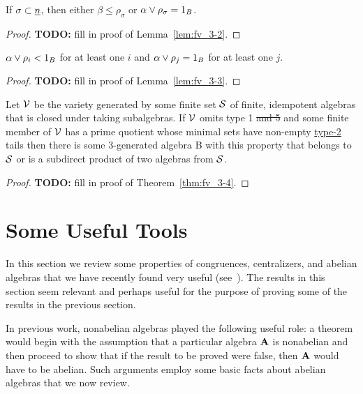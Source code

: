 \begin{lem}
  \label{lem:fv_3-2}
  If $\sigma \subset \underline{n}$, then
  either $\beta \leq \rho_\sigma$ or $\alpha \vee \rho_\sigma = 1_B$.
\end{lem}
\begin{proof}
  {\bf TODO:} fill in proof of  Lemma~\ref{lem:fv_3-2}.
\end{proof}

\begin{lem}
  \label{lem:fv_3-3}
  $\alpha \vee \rho_i < 1_B$ for at least one $i$ and $\alpha \vee \rho_j = 1_B$
  for at least one $j$.  
\end{lem}
\begin{proof}
  {\bf TODO:} fill in proof of  Lemma~\ref{lem:fv_3-3}.
\end{proof}

\begin{thm}
  \label{thm:fv_3-4}
  Let $\mathcal{V}$ be the variety generated by some finite set $\mathcal{S}$ of finite,
  idempotent algebras that is closed under taking subalgebras. If $\mathcal{V}$
  omits type 1 \sout{and 5} and some finite member of $\mathcal{V}$ has a prime quotient
  whose minimal sets have non-empty \underline{type-2} tails then there is some
  3-generated algebra B with this property that belongs to $\mathcal{S}$ or is a subdirect
  product of two algebras from $\mathcal{S}$. 
\end{thm}
\begin{proof}
  {\bf TODO:} fill in proof of Theorem~\ref{thm:fv_3-4}.
\end{proof}

\newpage

\section{Some Useful Tools}
In this section we review some properties of congruences, centralizers, and abelian
algebras that we have recently found very useful (see~\cite{Bergman-DeMeo}).
The results in this section seem relevant and perhaps useful for the purpose of
proving some of the results in the previous section.

In previous work, nonabelian algebras played the following useful role:
a theorem would begin with the assumption that a particular algebra $\mathbf{A}$ is
nonabelian and then proceed to show that if the result to be proved were false,
then $\mathbf{A}$ would have to be abelian.
Such arguments employ some basic facts about abelian algebras that we now review.


